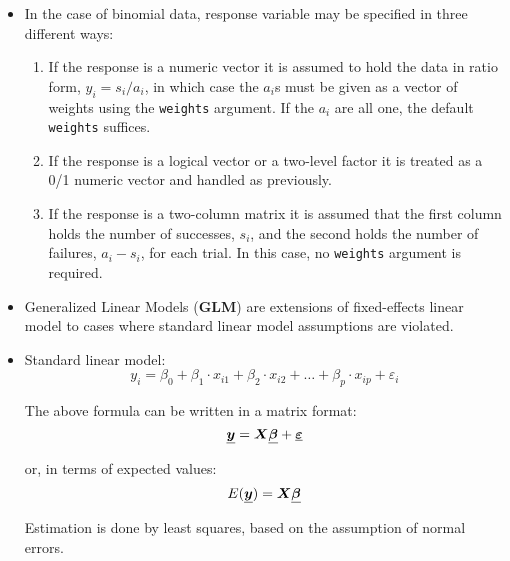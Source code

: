 
\begin{frame}
  \begin{itemize}
    \vspace{0.5cm}
    \item In the case of binomial data, response variable may be specified in three different ways:
      \begin{enumerate}
        \vspace{0.25cm}
        \item If the response is a numeric vector it is assumed to hold the data in ratio form, $ y_i = s_i / a_i $, in which case the $a_i$s must be given as a vector of weights using the \texttt{weights} argument. If the $ a_i $ are all one, the default \texttt{weights} suffices.
        \vspace{0.25cm}
        \item If the response is a logical vector or a two-level factor it is treated as a 0/1 numeric vector and handled as previously.
        \vspace{0.25cm}
        \item If the response is a two-column matrix it is assumed that the first column holds the number of successes, $ s_i $, and the second holds the number of failures, $ a_i - s_i $, for each trial. In this case, no \texttt{weights} argument is required.
      \end{enumerate}
  \end{itemize}
\end{frame}




\begin{frame}
  \begin{itemize}
    \item Generalized Linear Models (\textbf{GLM}) are extensions of fixed-effects linear model to cases where standard linear model assumptions are violated.
    \item Standard linear model:
      $$ y_i = \beta_0 + \beta_1 \cdot x_{i1} + \beta_2 \cdot x_{i2} + \dots + \beta_p \cdot x_{ip} + \varepsilon_i $$

      The above formula can be written in a matrix format:
      $$ \boldsymbol{\underline{y}} = \boldsymbol{X} \boldsymbol{\underline{\beta}} + \boldsymbol{\underline{\varepsilon}} $$

      or, in terms of expected values:
      $$ E(\boldsymbol{\underline{y}}) = \boldsymbol{X} \boldsymbol{\underline{\beta}} $$

      Estimation is done by least squares, based on the assumption of normal errors. 
  \end{itemize}
\end{frame}

